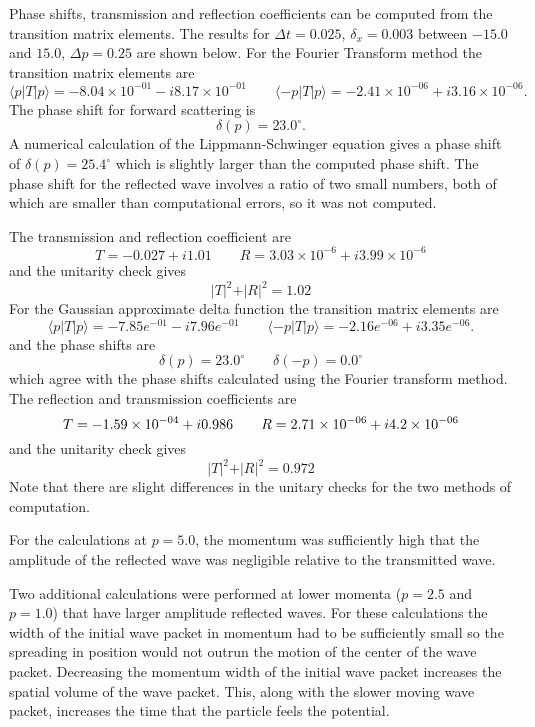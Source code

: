 \documentclass[aps,prc,reprint,noshowpacs,groupedaddress,onecolumn]{revtex4}
\begin{document}
Phase shifts, transmission and reflection coefficients can be
computed from the transition matrix elements.  The results for
$\Delta t=0.025$, $\delta_x= 0.003$ between $-15.0$ and $15.0$,
$\Delta p =0.25$ are shown below. 
For the Fourier Transform method
the transition matrix elements are
\[
\langle p \vert T \vert p \rangle = -8.04\times 10^{-01} -i 8.17 \times 10^{-01}  \qquad
\langle -p \vert T \vert p \rangle = - 2.41 \times 10^{-06} + i3.16 \times 10^{-06} .
\]
The phase shift for forward scattering is 
\[
\delta (p) =23.0^{\circ} .
\]
A numerical calculation of the Lippmann-Schwinger equation
gives a phase shift of $\delta (p)= 25.4^{\circ}$
which is slightly larger than the computed phase shift.
The phase shift for the reflected wave involves a ratio of two small
numbers, both of which are smaller than computational errors,
so it was not computed. 

The transmission and reflection coefficient are
\[
T=-0.027 + i 1.01  \qquad 
R=  3.03 \times 10^{-6} +i 3.99 \times 10^{-6}
\]
and the unitarity check gives
\[
\vert T\vert ^2+\vert R\vert ^2= 1.02
\]
For the Gaussian approximate delta function 
the transition matrix elements are
\[
\langle p \vert T \vert p \rangle = -7.85e^{-01} -i 7.96e^{-01} \qquad
\langle -p \vert T \vert p \rangle = -2.16e^{-06}  +i 3.35e^{-06} .
\]
and the phase shifts are
\[
\delta(p) = 23.0^{\circ} \qquad \delta(-p) = 0.0^{\circ} 
\]
which agree with the phase shifts calculated using
the Fourier transform method.
The reflection and transmission coefficients are
\[
T=-1.59\times 10^{-04} +i 0.986 \qquad
R =2.71\times 10^{-06} +i 4.2 \times 10^{-06}\\
\]
and the unitarity check gives
\[
\vert T\vert ^2+\vert R\vert^2= 0.972
\]
Note that there are slight differences in the unitary checks for
the two methods of computation.

For the calculations at $p=5.0$, the momentum was sufficiently high that
the amplitude of the reflected wave was negligible relative to the
transmitted wave.

Two additional calculations were performed at lower momenta ($p=2.5$
and $p=1.0$) that have larger amplitude reflected waves.  For these
calculations the width of the initial wave packet in momentum had to
be sufficiently small so the spreading in position would not outrun
the motion of the center of the wave packet.  Decreasing the momentum
width of the initial wave packet increases the spatial volume of the
wave packet.  This, along with the slower moving wave packet,
increases the time that the particle feels the potential.
\end{document}
